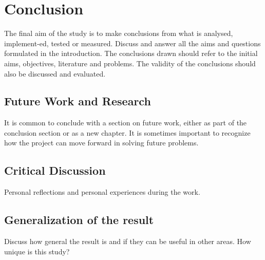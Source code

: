 
\clearpage

\fancyhead{} %

\chapter{Conclusion}\thispagestyle{fancy}

The final aim of the study is to make conclusions from what is analysed, implement-ed, tested or measured. Discuss and answer all the aims and questions formulated in the introduction. The conclusions drawn should refer to the initial aims, objectives, literature and problems. The validity of the conclusions should also be discussed and evaluated. 

\begin{comment}
To write notes or comments that isn't published in the pdf.
\end{comment}

\section{Future Work and Research}
It is common to conclude with a section on future work, either as part of the conclusion section or as a new chapter. It is sometimes important to recognize how the project can move forward in solving future problems. 

\begin{comment}
To write notes or comments that isn't published in the pdf.
\end{comment}

\section{Critical Discussion}
Personal reflections and personal experiences during the work. 

\begin{comment}
To write notes or comments that isn't published in the pdf.
\end{comment}

\section{Generalization of the result}
Discuss how general the result is and if they can be useful in other areas. How unique is this study?

\begin{comment}
To write notes or comments that isn't published in the pdf.
\end{comment}
